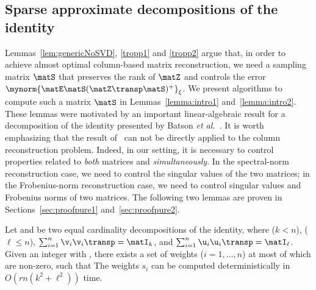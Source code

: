 \subsection{Sparse approximate decompositions of the identity}
\label{sec:mainsparse}
Lemmas~\ref{lem:genericNoSVD}, \ref{tropp1} and \ref{tropp2} argue that,
 in order to achieve almost optimal column-based matrix reconstruction,
 we need a sampling matrix $\matS$ that preserves the rank of $\matZ$ and controls the error $\mynorm{\matE \matS(\matZ\transp \matS)^+}_\xi$. We present algorithms to compute such a matrix $\matS$ in
Lemmas~\ref{lemma:intro1} and~\ref{lemma:intro2}. These lemmas were motivated by an important linear-algebraic result for a decomposition of the identity presented by Batson \textit{et al.}~\cite{BSS09}.
 It is worth emphasizing that the result of~\cite{BSS09} can not be directly
applied to the column reconstruction problem. Indeed, in our setting, it is necessary to control properties related to \textit{both} matrices
\math{\matZ} and \math{\matE =\matA - \matB \matZ\transp} \emph{simultaneously}. In the spectral-norm reconstruction case, we need to control
the singular values of the two matrices;
in the Frobenius-norm reconstruction case, we need to control
singular values and Frobenius norms of two matrices. The following two lemmas are proven in Sections~\ref{sec:proofpure1} and~\ref{sec:proofpure2}.
\begin{lemma} \label{lemma:intro1}
Let  and 
be two equal cardinality decompositions of the identity, where
 ($k < n$),  ($\ell \leq n$),
$\sum_{i=1}^n\v_i\v_i\transp=\matI_{k}$, and $\sum_{i=1}^n\u_i\u_i\transp=\matI_{\ell}$.
Given an integer  with , there exists a set of weights
 ($i=1,\ldots,n$) {at most  of which are non-zero}, such that
The weights $s_i$ can be computed deterministically in $O\left(r n \left(k^2+\ell^2\right) \right)$ time.
\end{lemma}

